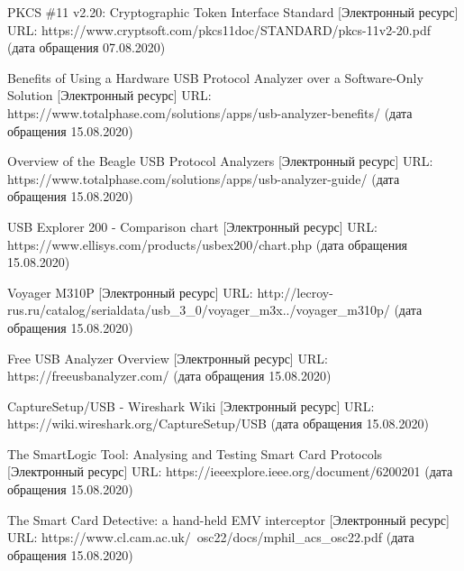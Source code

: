 \begin{thebibliography}{00}
  PKCS \#11 v2.20: Cryptographic Token Interface Standard
  [Электронный ресурс] URL:
  https://www.cryptsoft.com/pkcs11doc/STANDARD/pkcs-11v2-20.pdf
  (дата обращения 07.08.2020)

  Benefits of Using a Hardware USB Protocol Analyzer over a Software-Only Solution
  [Электронный ресурс] URL:
  https://www.totalphase.com/solutions/apps/usb-analyzer-benefits/
  (дата обращения 15.08.2020)

  Overview of the Beagle USB Protocol Analyzers
  [Электронный ресурс] URL:
  https://www.totalphase.com/solutions/apps/usb-analyzer-guide/
  (дата обращения 15.08.2020)

  USB Explorer 200 - Comparison chart
  [Электронный ресурс] URL:
  https://www.ellisys.com/products/usbex200/chart.php
  (дата обращения 15.08.2020)

  Voyager M310P
  [Электронный ресурс] URL:
  http://lecroy-rus.ru/catalog/serialdata/usb\_3\_0/voyager\_m3x../voyager\_m310p/
  (дата обращения 15.08.2020)

  Free USB Analyzer Overview
  [Электронный ресурс] URL:
  https://freeusbanalyzer.com/
  (дата обращения 15.08.2020)

  CaptureSetup/USB - Wireshark Wiki
  [Электронный ресурс] URL:
  https://wiki.wireshark.org/CaptureSetup/USB
  (дата обращения 15.08.2020)

  The SmartLogic Tool: Analysing and Testing Smart Card Protocols
  [Электронный ресурс] URL:
  https://ieeexplore.ieee.org/document/6200201
  (дата обращения 15.08.2020)

  The Smart Card Detective: a hand-held EMV interceptor
  [Электронный ресурс] URL:
  https://www.cl.cam.ac.uk/~osc22/docs/mphil\_acs\_osc22.pdf
  (дата обращения 15.08.2020)

\end{thebibliography}
\endgroup

\clearpage

